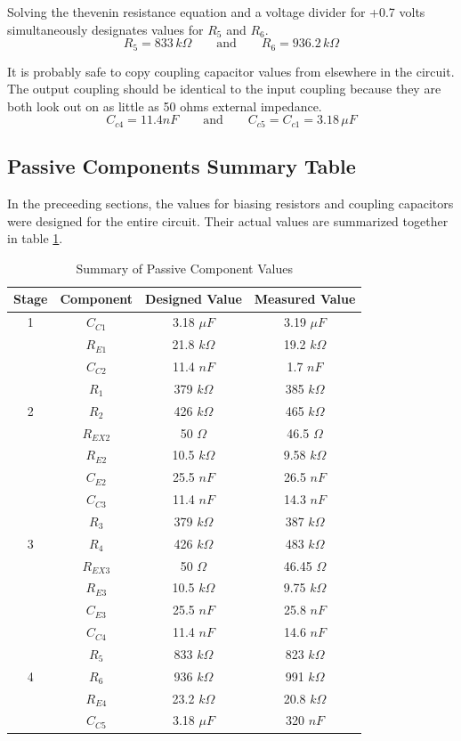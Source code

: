 \documentclass[titlepage, letterpaper, 10.5pt]{article}
\begin{document}
Solving the thevenin resistance equation and a voltage divider for
+0.7 volts simultaneously designates values for $R_{5}$ and $R_{6}$.
\begin{equation*}
R_{5}=833\,k\Omega\qquad\textrm{and}\qquad R_{6}=936.2\,k\Omega
\end{equation*}

It is probably safe to copy coupling capacitor values from elsewhere
in the circuit. The output coupling should be identical to the input
coupling because they are both look out on as little as 50 ohms external
impedance.
\begin{equation*}
C_{c4}=11.4nF\qquad\textrm{and}\qquad C_{c5}=C_{c1}=3.18\,\mu F
\end{equation*}

\subsection{Passive Components Summary Table}

In the preceeding sections, the values for biasing resistors and
coupling capacitors were designed for the entire circuit. Their
actual values are summarized together in table
\ref{passiveComponents}.

\begin{table}[ht]
\centering
\caption{Summary of Passive Component Values}
\begin{tabular}{c|c|c|c}
\hline\hline
Stage	&Component	&Designed Value	&Measured Value	\\
\hline\hline
1		&$C_{C1}$	&3.18 $\mu F$	&3.19 $\mu F$	\\
		&$R_{E1}$	&21.8 $k\Omega$	&19.2 $k\Omega$	\\
\hline
		&$C_{C2}$	&11.4 $nF$		&1.7 $nF$		\\
		&$R_{1}$		&379 $k\Omega$	&385 $k\Omega$	\\
2		&$R_{2}$		&426 $k\Omega$	&465 $k\Omega$	\\
		&$R_{EX2}$	&50 $\Omega$	&46.5 $\Omega$	\\
		&$R_{E2}$	&10.5 $k\Omega$	&9.58 $k\Omega$	\\
		&$C_{E2}$	&25.5 $nF$		&26.5 $nF$		\\
\hline
		&$C_{C3}$	&11.4 $nF$		&14.3 $nF$		\\
		&$R_{3}$		&379 $k\Omega$	&387 $k\Omega$	\\
3		&$R_{4}$		&426 $k\Omega$	&483 $k\Omega$	\\
		&$R_{EX3}$	&50 $\Omega$	&46.45 $\Omega$	\\
		&$R_{E3}$	&10.5 $k\Omega$	&9.75 $k\Omega$	\\
		&$C_{E3}$	&25.5 $nF$		&25.8 $nF$		\\
\hline
		&$C_{C4}$	&11.4 $nF$		&14.6 $nF$		\\
		&$R_{5}$		&833 $k\Omega$	&823 $k\Omega$	\\
4		&$R_{6}$		&936 $k\Omega$	&991 $k\Omega$	\\
		&$R_{E4}$	&23.2 $k\Omega$	&20.8 $k\Omega$	\\
		&$C_{C5}$	&3.18 $\mu F$	&320 $nF$		\\
\hline\hline
\end{tabular}
\label{passiveComponents}
\end{table}
\end{document}
